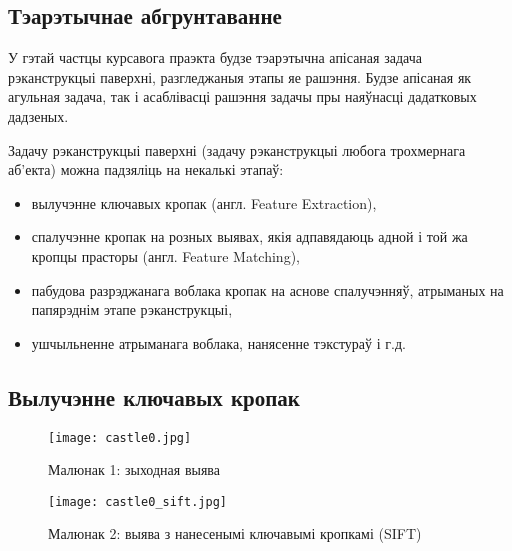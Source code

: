 \begin{center}
    \section*{Тэарэтычнае абгрунтаванне}    
\end{center}

У гэтай частцы курсавога праэкта будзе тэарэтычна апісаная задача рэканструкцыі паверхні, разгледжаныя этапы яе рашэння. Будзе апісаная як агульная задача, так і асаблівасці рашэння задачы пры наяўнасці дадатковых дадзеных.\par

\vspace{5mm}

Задачу рэканструкцыі паверхні (задачу рэканструкцыі любога трохмернага аб'екта) можна падзяліць на некалькі этапаў:
\begin{itemize}
    \item вылучэнне ключавых кропак (англ. Feature Extraction),
    \item спалучэнне кропак на розных выявах, якія адпавядаюць адной і той жа кропцы прасторы (англ. Feature Matching),
    \item пабудова разрэджанага воблака кропак на аснове спалучэнняў, атрыманых на папярэднім этапе рэканструкцыі,
    \item ушчыльненне атрыманага воблака, нанясенне тэкстураў і г.д.
\end{itemize}

\subsection*{Вылучэнне ключавых кропак}

\begin{figure}[h]
    \centering
    \texttt{[image: castle0.jpg]}
    \captionsetup{labelformat=empty}
    \caption{Малюнак 1: зыходная выява}
    \label{fig:sift0}
\end{figure}

\begin{figure}[t]
    \centering
    \texttt{[image: castle0\_sift.jpg]}
    \captionsetup{labelformat=empty}
    \caption{Малюнак 2: выява з нанесенымі ключавымі кропкамі (SIFT)}
    \label{fig:sift1}
\end{figure}

